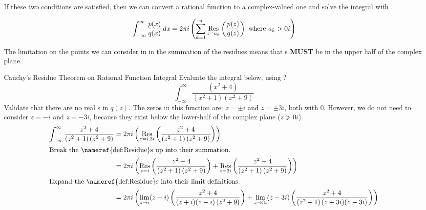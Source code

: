 If these two conditions are satisfied, then we can convert a rational function to a complex-valued one and solve the integral with .

\begin{equation}\label{eq:Rational_Function_Complex_Integral}
  \int_{-\infty}^{\infty} \frac{p(x)}{q(x)} \, dx = 2 \pi i \left( \sum_{k=1}^{n} \Residue{\frac{p(z)}{q(z)}}{z=a_{k}} \text{ where } a_{k} > 0i \right)
\end{equation}

The limitation on the points we can consider in in the summation of the residues means that s \textbf{MUST} be in the upper half of the complex plane.

\begin{example}{Cauchy's Residue Theorem on Rational Function Integral}
  Evaluate the integral below, using ?
  \begin{equation*}
    \int_{-\infty}^{\infty} \frac{ \left( x^{2} + 4 \right)}{\left( x^{2} + 1 \right) \left( x^{2} + 9 \right)}
  \end{equation*}
  \tcblower{}
  Validate that there are no real s in $q(z)$.
  The zeros in this function are: $z = \pm i$ and $z = \pm 3i$, both with  0.
  However, we do not need to consider $z = -i$ and $z = -3i$, because they exist below the lower-half of the complex plane ($z \ngtr 0i$).
  \begin{align*}
    \int_{-\infty}^{\infty} \frac{z^{2} + 4}{\left( z^{2} + 1 \right) \left( z^{2} + 9 \right)} &= 2 \pi i \left( \Residue{\frac{z^{2} + 4}{\left( z^{2} + 1 \right) \left( z^{2} + 9 \right)}}{z = i, 3i} \right) \\
    \shortintertext{Break the \nameref{def:Residue}s up into their summation.}
                                                                                                &= 2 \pi i \left( \Residue{\frac{z^{2} + 4}{\left( z^{2} + 1 \right) \left( z^{2} + 9 \right)}}{z=i} + \Residue{\frac{z^{2} + 4}{\left( z^{2} + 1 \right) \left( z^{2} + 9 \right)}}{z=3i} \right) \\
    \shortintertext{Expand the \nameref{def:Residue}s into their limit definitions.}
                                                                                                &= 2 \pi i \left( \lim\limits_{z \to i} (z-i) \left( \frac{z^{2} + 4}{(z+i) (z-i) \left( z^{2} + 9 \right)} \right) + \lim\limits_{z \to 3i} (z-3i) \left( \frac{z^{2} + 4}{\left( z^{2} + 1 \right) (z + 3i) (z-3i)} \right) \right) \\

\end{align*}
\end{example}
